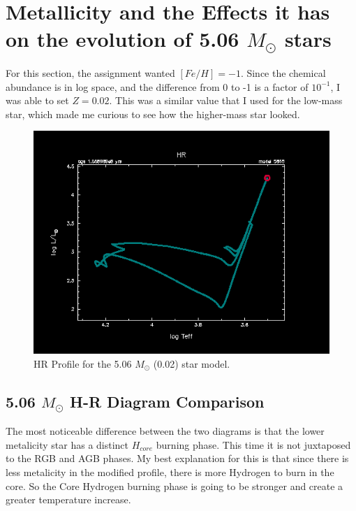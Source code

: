 \documentclass[fleqn,usenatbib]{mnras}
\begin{document}
\section{Metallicity and the Effects it has on the evolution of 5.06 \(M_\odot\) stars}
For this section, the assignment wanted $[Fe/H] = -1$.  Since the chemical abundance is in log space, and the difference from 0 to -1 is a factor of $10^{-1}$, I was able to set $Z=0.02$.  This was a similar value that I used for the low-mass star, which made me curious to see how the higher-mass star looked.

\begin{figure}

	\includegraphics[width=\columnwidth]{hr_profile_05865.png}
    \caption{HR Profile for the 5.06 $M_\odot$ (0.02) star model.}
    \label{fig:5.06_Msol_0.02_hr_figure}
\end{figure}



\subsection{5.06 \(M_\odot\) H-R Diagram Comparison}
\par The most noticeable difference between the two diagrams is that the lower metalicity star has a distinct $H_{core}$ burning phase.  This time it is not juxtaposed to the RGB and AGB phases. My best explanation for this is that since there is less metalicity in the modified profile, there is more Hydrogen to burn in the core.  So the Core Hydrogen burning phase is going to be stronger and create a greater temperature increase.
\end{document}
